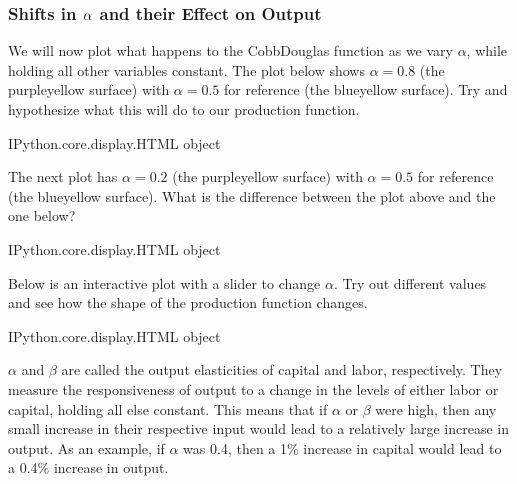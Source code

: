 \documentclass[letterpaper,10pt,english]{jupyterBook}
\begin{document}
\subsubsection{Shifts in \protect\(\alpha\protect\) and their Effect on Output}
\label{\detokenize{content/04-production/shifts:shifts-in-alpha-and-their-effect-on-output}}
\sphinxAtStartPar
We will now plot what happens to the Cobb\sphinxhyphen{}Douglas function as we vary \(\alpha\), while holding all other variables constant. The plot below shows \(\alpha = 0.8\) (the purple\sphinxhyphen{}yellow surface) with \(\alpha=0.5\) for reference (the blue\sphinxhyphen{}yellow surface). Try and hypothesize what this will do to our production function.

\begin{sphinxVerbatim}[commandchars=\\\{\}]
\PYGZlt{}IPython.core.display.HTML object\PYGZgt{}
\end{sphinxVerbatim}

\sphinxAtStartPar
The next plot has \(\alpha = 0.2\) (the purple\sphinxhyphen{}yellow surface) with \(\alpha=0.5\) for reference (the blue\sphinxhyphen{}yellow surface). What is the difference between the plot above and the one below?

\begin{sphinxVerbatim}[commandchars=\\\{\}]
\PYGZlt{}IPython.core.display.HTML object\PYGZgt{}
\end{sphinxVerbatim}

\sphinxAtStartPar
Below is an interactive plot with a slider to change \(\alpha\). Try out different values and see how the shape of the production function changes.

\begin{sphinxVerbatim}[commandchars=\\\{\}]
\PYGZlt{}IPython.core.display.HTML object\PYGZgt{}
\end{sphinxVerbatim}

\sphinxAtStartPar
\(\alpha\) and \(\beta\) are called the output elasticities of capital and labor, respectively. They measure the responsiveness of output to a change in the levels of either labor or capital, holding all else constant. This means that if \(\alpha\) or \(\beta\) were high, then any small increase in their respective input would lead to a relatively large increase in output. As an example, if \(\alpha\) was 0.4, then a 1\% increase in capital would lead to a 0.4\% increase in output.
\end{document}
